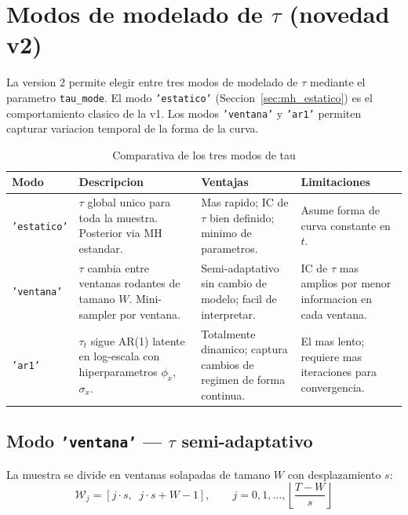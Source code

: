 \documentclass[12pt, a4paper]{article}
\theoremstyle{plain}
\theoremstyle{definition}
\theoremstyle{remark}
\begin{document}
\section{Modos de modelado de $\tau$ (novedad v2)}
\label{sec:tau_modos}

La version 2 permite elegir entre tres modos de modelado de $\tau$
mediante el parametro \texttt{tau\_mode}. El modo \texttt{'estatico'}
(Seccion~\ref{sec:mh_estatico}) es el comportamiento clasico de la v1.
Los modos \texttt{'ventana'} y \texttt{'ar1'} permiten capturar variacion
temporal de la forma de la curva.

\begin{table}[H]
\centering
\caption{Comparativa de los tres modos de tau}
\label{tab:tau_modos}
\small
\begin{tabular}{L{2.2cm} L{4.5cm} L{4.0cm} L{3.0cm}}
\toprule
\textbf{Modo} & \textbf{Descripcion} & \textbf{Ventajas} & \textbf{Limitaciones} \\
\midrule
\texttt{'estatico'} &
  $\tau$ global unico para toda la muestra. Posterior via MH estandar. &
  Mas rapido; IC de $\tau$ bien definido; minimo de parametros. &
  Asume forma de curva constante en $t$. \\
\addlinespace
\texttt{'ventana'} &
  $\tau$ cambia entre ventanas rodantes de tamano $W$. Mini-sampler por ventana. &
  Semi-adaptativo sin cambio de modelo; facil de interpretar. &
  IC de $\tau$ mas amplios por menor informacion en cada ventana. \\
\addlinespace
\texttt{'ar1'} &
  $\tau_t$ sigue AR(1) latente en log-escala con hiperparametros $\phi_x$, $\sigma_x$. &
  Totalmente dinamico; captura cambios de regimen de forma continua. &
  El mas lento; requiere mas iteraciones para convergencia. \\
\bottomrule
\end{tabular}
\end{table}

\subsection{Modo \texttt{'ventana'} --- $\tau$ semi-adaptativo}

La muestra se divide en ventanas solapadas de tamano $W$
con desplazamiento $s$:
\begin{equation}
  \mathcal{W}_j = [j\cdot s,\;\; j\cdot s + W - 1], \qquad
  j = 0, 1, \ldots, \left\lfloor\frac{T - W}{s}\right\rfloor
  \label{eq:ventana}
\end{equation}
\end{document}
